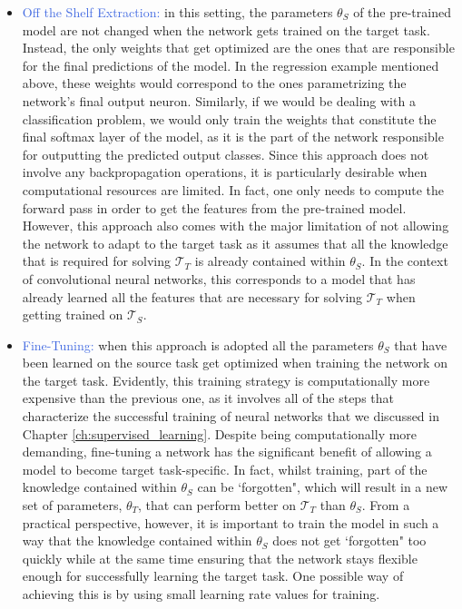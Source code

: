 \begin{itemize}
	\item \textcolor{RoyalBlue}{Off the Shelf Extraction:} in this setting, the parameters $\theta_S$ of the pre-trained model are not changed when the network gets trained on the target task. Instead, the only weights that get optimized are the ones that are responsible for the final predictions of the model. In the regression example mentioned above, these weights would correspond to the ones parametrizing the network's final output neuron. Similarly, if we would be dealing with a classification problem, we would only train the weights that constitute the final softmax layer of the model, as it is the part of the network responsible for outputting the predicted output classes. Since this approach does not involve any backpropagation operations, it is particularly desirable when computational resources are limited. In fact, one only needs to compute the forward pass in order to get the features from the pre-trained model. However, this approach also comes with the major limitation of not allowing the network to adapt to the target task as it assumes that all the knowledge that is required for solving $\mathcal{T}_T$ is already contained within $\theta_S$. In the context of convolutional neural networks, this corresponds to a model that has already learned all the features that are necessary for solving $\mathcal{T}_T$ when getting trained on $\mathcal{T}_S$.   

	\item \textcolor{RoyalBlue}{Fine-Tuning:} when this approach is adopted all the parameters $\theta_S$ that have been learned on the source task get optimized when training the network on the target task. Evidently, this training strategy is computationally more expensive than the previous one, as it involves all of the steps that characterize the successful training of neural networks that we discussed in Chapter \ref{ch:supervised_learning}. Despite being computationally more demanding, fine-tuning a network has the significant benefit of allowing a model to become target task-specific. In fact, whilst training, part of the knowledge contained within $\theta_S$ can be `forgotten", which will result in a new set of parameters, $\theta_T$, that can perform better on $\mathcal{T}_T$ than $\theta_S$. From a practical perspective, however, it is important to train the model in such a way that the knowledge contained within $\theta_S$ does not get `forgotten" too quickly while at the same time ensuring that the network stays flexible enough for successfully learning the target task. One possible way of achieving this is by using small learning rate values for training.      
\end{itemize}


